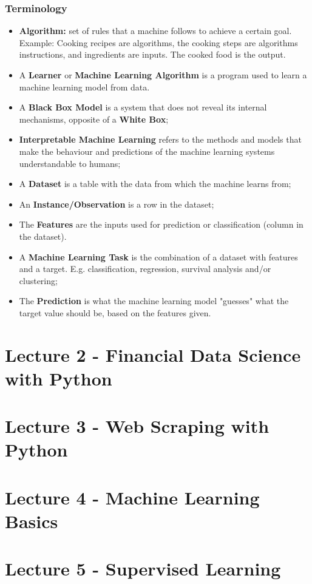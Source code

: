 \documentclass[11pt,a4paper]{report}
\begin{document}
\subsection{Terminology}
\begin{itemize}
    \item \textbf{Algorithm:} set of rules that a machine follows to achieve a certain goal. Example: Cooking recipes are algorithms, the cooking steps are algorithms instructions, and ingredients are inputs. The cooked food is the output.
    \item A \textbf{Learner} or \textbf{Machine Learning Algorithm} is a program used to learn a machine learning model from data.
    \item A \textbf{Black Box Model} is a system that does not reveal its internal mechanisms, opposite of a \textbf{White Box};
    \item \textbf{Interpretable Machine Learning} refers to the methods and models that make the behaviour and predictions of the machine learning systems understandable to humans;
    \item A \textbf{Dataset} is a table with the data from which the machine learns from;
    \item An \textbf{Instance/Observation} is a row in the dataset;
    \item The \textbf{Features} are the inputs used for prediction or classification (column in the dataset).
    \item A \textbf{Machine Learning Task} is the combination of a dataset with features and a target. E.g. classification, regression, survival analysis and/or clustering;
    \item The \textbf{Prediction} is what the machine learning model "guesses" what the target value should be, based on the features given.
\end{itemize}

\chapter{Lecture 2 - Financial Data Science with Python}
\chapter{Lecture 3 - Web Scraping with Python}
\chapter{Lecture 4 - Machine Learning Basics}
\chapter{Lecture 5 - Supervised Learning}
\end{document}
